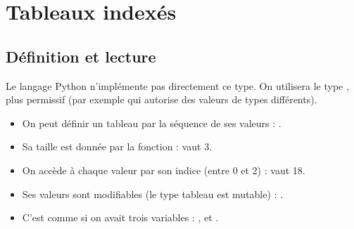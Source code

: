 \chapter{Tableaux indexés}

\section{Définition et lecture}


Le langage Python n'implémente pas directement ce type. On utilisera le type , plus permissif (par exemple qui autorise des valeurs de types différents).

\begin{itemize}
	\item On peut définir un tableau par la séquence de ses valeurs : .
	\item Sa taille est donnée par la fonction  :  vaut 3.
	\item On accède à chaque valeur par son indice (entre 0 et 2) :  vaut 18.
	\item Ses valeurs sont modifiables (le type tableau est mutable) : .
	\item C'est comme si on avait trois variables : ,  et .
\end{itemize}

